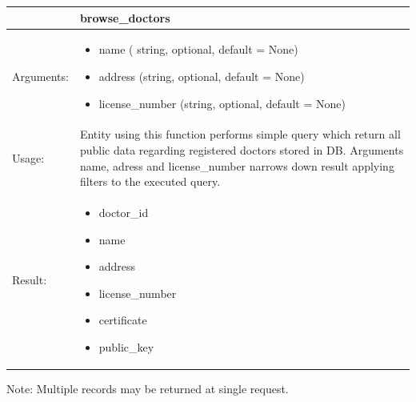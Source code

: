 \begin{table}[h]
    \begin{tabular}{| p{6cm} | p{7.75cm} |}
    \hline
     & browse\_doctors \\ \hline
    Arguments: &  \begin{itemize}
    	\item name ( string, optional, default = None)
		\item address (string, optional, default = None)
		\item license\_number (string, optional, default = None)

	\end{itemize}     \\ \hline
    Usage: & Entity using this function performs simple query which return all public data regarding registered doctors stored in DB. Arguments name, adress and license\_number narrows down result applying filters to the executed query. \\ \hline
    Result: & \begin{itemize}
    	\item doctor\_id
		\item name
		\item address
		\item license\_number
		\item certificate
		\item public\_key
	\end{itemize}     \\ \hline	
    \end{tabular}
\end{table}
Note: Multiple records may be returned at single request.

